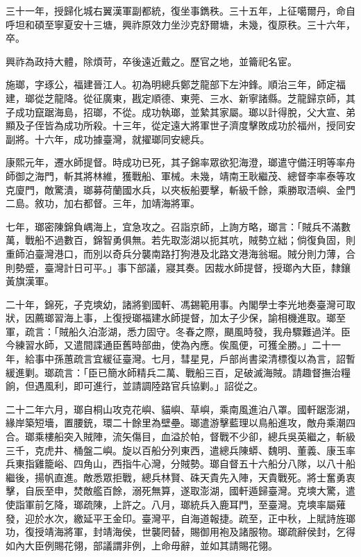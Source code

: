 \begin{pinyinscope}
三十一年，授歸化城右翼漢軍副都統，復坐事鐫秩。三十五年，上征噶爾丹，命自呼坦和碩至寧夏安十三塘，興祚原效力坐沙克舒爾塘，未幾，復原秩。三十六年，卒。

興祚為政持大體，除煩苛，卒後遠近戴之。歷官之地，並籥祀名宦。

施瑯，字琢公，福建晉江人。初為明總兵鄭芝龍部下左沖鋒。順治三年，師定福建，瑯從芝龍降。從征廣東，戡定順德、東莞、三水、新寧諸縣。芝龍歸京師，其子成功竄踞海島，招瑯，不從。成功執瑯，並縶其家屬。瑯以計得脫，父大宣、弟顯及子侄皆為成功所殺。十三年，從定遠大將軍世子濟度擊敗成功於福州，授同安副將。十六年，成功據臺灣，就擢瑯同安總兵。

康熙元年，遷水師提督。時成功已死，其子錦率眾欲犯海澄，瑯遣守備汪明等率舟師御之海門，斬其將林維，獲戰船、軍械。未幾，靖南王耿繼茂、總督李率泰等攻克廈門，敵驚潰，瑯募荷蘭國水兵，以夾板船要擊，斬級千餘，乘勝取浯嶼、金門二島。敘功，加右都督。三年，加靖海將軍。

七年，瑯密陳錦負嵎海上，宜急攻之。召詣京師，上詢方略，瑯言：「賊兵不滿數萬，戰船不過數百，錦智勇俱無。若先取澎湖以扼其吭，賊勢立絀；倘復負固，則重師泊臺灣港口，而別以奇兵分襲南路打狗港及北路文港海翁堀。賊分則力薄，合則勢蹙，臺灣計日可平。」事下部議，寢其奏。因裁水師提督，授瑯內大臣，隸鑲黃旗漢軍。

二十年，錦死，子克塽幼，諸將劉國軒、馮錫範用事。內閣學士李光地奏臺灣可取狀，因薦瑯習海上事，上復授瑯福建水師提督，加太子少保，諭相機進取。瑯至軍，疏言：「賊船久泊澎湖，悉力固守。冬春之際，颶風時發，我舟驟難過洋。臣今練習水師，又遣間諜通臣舊時部曲，使為內應。俟風便，可獲全勝。」二十一年，給事中孫蕙疏言宜緩征臺灣。七月，彗星見，戶部尚書梁清標復以為言，詔暫緩進剿。瑯疏言：「臣已簡水師精兵二萬、戰船三百，足破滅海賊。請趣督撫治糧餉，但遇風利，即可進行，並請調陸路官兵協剿。」詔從之。

二十二年六月，瑯自桐山攻克花嶼、貓嶼、草嶼，乘南風進泊八罩。國軒踞澎湖，緣岸築短墻，置腰銃，環二十餘里為壁壘。瑯遣游擊藍理以鳥船進攻，敵舟乘潮四合。瑯乘樓船突入賊陣，流矢傷目，血溢於帕，督戰不少卻，總兵吳英繼之，斬級三千，克虎井、桶盤二嶼。旋以百船分列東西，遣總兵陳蟒、魏明、董義、康玉率兵東指雞籠峪、四角山，西指牛心灣，分賊勢。瑯自督五十六船分八隊，以八十船繼後，揚帆直進。敵悉眾拒戰，總兵林賢、硃天貴先入陣，天貴戰死。將士奮勇衷擊，自辰至申，焚敵艦百餘，溺死無算，遂取澎湖，國軒遁歸臺灣。克塽大驚，遣使詣軍前乞降，瑯疏陳，上許之。八月，瑯統兵入鹿耳門，至臺灣。克塽率屬薙發，迎於水次，繳延平王金印。臺灣平，自海道報捷。疏至，正中秋，上賦詩旌瑯功，復授靖海將軍，封靖海侯，世襲罔替，賜御用袍及諸服物。瑯疏辭侯封，乞得如內大臣例賜花翎，部議謂非例，上命毋辭，並如其請賜花翎。


\end{pinyinscope}
